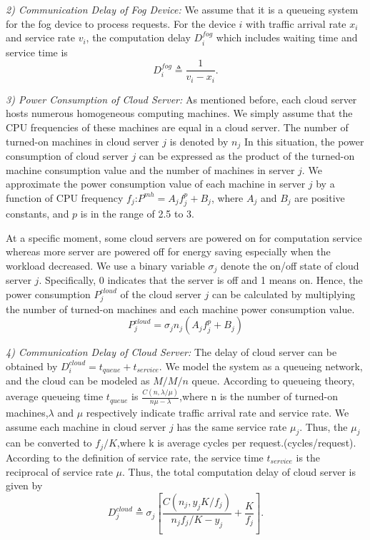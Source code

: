 \documentclass[twoside,twocolumn]{article}
\begin{document}
\textit{2) Communication Delay of Fog Device:} We assume that it is a queueing system for the fog device to process requests. For the device $i$ with traffic arrival rate $x_i$ and service rate $v_i$, the computation delay $D_i^{fog}$ which includes waiting time and service time is 
$$ D_i^{fog} \triangleq \frac{1}{v_i-x_i} .$$

\textit{3) Power Consumption of Cloud Server:} As mentioned before, each cloud server hosts numerous homogeneous computing machines. We simply assume that the CPU frequencies of these machines are equal in a cloud server. The number of turned-on machines in cloud server $j$ is denoted by $n_j$ In this situation, the power consumption of cloud server $j$ can be expressed as the product of the turned-on machine consumption value and the number of machines in server $j$. We approximate the power consumption value of each machine in server $j$ by a function of CPU frequency $f_j$:$P^{mh} = A_jf_j^p+B_j$, where $A_j$ and $B_j$ are positive constants, and $p$ is in the range of 2.5 to 3. 

At a specific moment, some cloud servers are powered on for computation service whereas more server are powered off for energy saving especially when the workload decreased. We use a binary variable $\sigma_j$ denote the on/off state of cloud server $j$. Specifically, 0 indicates that the server is off and 1 means on. Hence, the power consumption $P_j^{cloud}$ of the cloud server $j$ can be calculated by multiplying the number of turned-on machines and each machine power consumption value.
$$P_j^{cloud} = \sigma_jn_j\left(A_jf_j^p+B_j\right)$$

\textit{4) Communication Delay of Cloud Server:} The delay of cloud server can be obtained by $D_i^{cloud} = t_{queue}+t_{service}$. We model the system as a queueing network, and the cloud can be modeled as $M/M/n$ queue. According to queueing theory, average queueing time $t_{queue}$ is $\frac{C(n,\lambda/\mu)}{n\mu-\lambda}$,where n is the number of turned-on machines,$\lambda$ and $\mu$ respectively indicate traffic arrival rate and service rate. We assume each machine in cloud server $j$ has the same service rate $\mu_{j}$. Thus, the $\mu_j$ can be converted to $f_j/K$,where k is average cycles per request.(cycles/request). According to the definition of service rate, the service time $t_{service}$ is the reciprocal of service rate $\mu$. Thus, the total computation delay of cloud server is given by
$$D_j^{cloud} \triangleq \sigma_j\left[\frac{C\left(n_j,y_jK/f_j\right)}{n_jf_j/K-y_j} + \frac{K}{f_j}\right].$$
\end{document}
